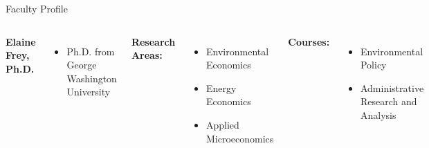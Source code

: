 \documentclass[10pt]{beamer}
\newlength{\imageheight}
\begin{document}
        \begin{frame}{Faculty Profile}
        \begin{columns}[T]
        \textbf{Elaine Frey, Ph.D.}
        \begin{itemize}
        \item Ph.D. from George Washington University
        \end{itemize}
        
        \textbf{Research Areas:}
        \begin{itemize}
        \item Environmental Economics
        \item Energy Economics
        \item Applied Microeconomics
        \end{itemize}
        
        \textbf{Courses:} 
        \begin{itemize}
        \item Environmental Policy
        \item Administrative Research and Analysis
        \end{itemize}
        
        \vspace*{0.5cm}
        \includegraphics[height=\imageheight]{images/frey.jpg}
        \end{columns}
        \end{frame}
        
\end{document}
